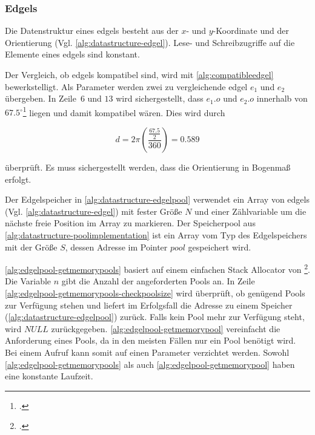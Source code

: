 \subsubsection{Edgels} %
\label{sub:datenstruktur-edgels}

Die Datenstruktur eines \glspl{edgel} besteht aus der $x$- und $y$-Koordinate und der Orientierung
 (Vgl. \autoref{alg:datastructure-edgel}). Lese- und Schreibzugriffe auf die Elemente eines \glspl{edgel} sind konstant.



Der Vergleich, ob \glspl{edgel} kompatibel sind, wird mit \autoref{alg:compatibleedgel} bewerkstelligt. Als Parameter
 werden zwei zu vergleichende \gls{edgel} $e_1$ und $e_2$ übergeben. In Zeile~$6$ und $13$ wird sichergestellt, dass
 $e_1.o$ und $e_2.o$ innerhalb von $67.5^\circ$\footcite[Vgl.][S.~417]{clarke96} liegen und damit kompatibel wären.
 Dies wird durch

\begin{equation}
	d = 2 \pi \left( \frac{ \frac{67.5}{2} }{360} \right) = 0.589
\end{equation}

überprüft. Es muss sichergestellt werden, dass die Orientierung in Bogenmaß erfolgt.



Der Edgelspeicher in \autoref{alg:datastructure-edgelpool} verwendet ein Array von \glspl{edgel}
 (Vgl. \autoref{alg:datastructure-edgel}) mit fester Größe $N$ und einer Zählvariable um die nächste freie Position im
 Array zu markieren. Der Speicherpool aus \autoref{alg:datastructure-poolimplementation} ist ein Array vom Typ des
 Edgelspeichers mit der Größe $S$, dessen Adresse im Pointer $\mathit{pool}$ gespeichert wird.



\autoref{alg:edgelpool-getmemorypools} basiert auf einem einfachen Stack Allocator von
 \citeauthor{kr}\footcite[Vgl.][S.~100--104]{kr}. Die Variable $n$ gibt die Anzahl der angeforderten Pools an. In Zeile
 \ref{alg:edgelpool-getmemorypools-checkpoolsize} wird überprüft, ob genügend Pools zur Verfügung stehen und liefert im
 Erfolgsfall die Adresse zu einem Speicher (\autoref{alg:datastructure-edgelpool}) zurück. Falls kein Pool mehr zur
 Verfügung steht, wird $\mathit{NULL}$ zurückgegeben. \autoref{alg:edgelpool-getmemorypool} vereinfacht die Anforderung
 eines Pools, da in den meisten Fällen nur ein Pool benötigt wird. Bei einem Aufruf kann somit auf einen Parameter
 verzichtet werden. Sowohl \autoref{alg:edgelpool-getmemorypools} als auch \autoref{alg:edgelpool-getmemorypool} haben
 eine konstante Laufzeit.

